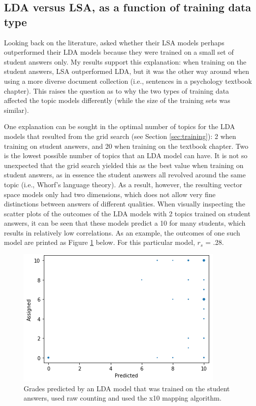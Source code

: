 \documentclass[a4paper,10pt,twoside]{article}
\begin{document}
\subsection{LDA versus LSA, as a function of training data type}
Looking back on the literature,  asked whether their LSA models perhaps outperformed their LDA models because they were trained on a small set of student answers only. My results support this explanation: when training on the student answers, LSA outperformed LDA, but it was the other way around when using a more diverse document collection (i.e., sentences in a psychology textbook chapter). This raises the question as to why the two types of training data affected the topic models differently (while the size of the training sets was similar).

One explanation can be sought in the optimal number of topics for the LDA models that resulted from the grid search (see Section \ref{sec:training}): 2 when training on student answers, and 20 when training on the textbook chapter. Two is the lowest possible number of topics that an LDA model can have. It is not so unexpected that the grid search yielded this as the best value when training on student answers, as in essence the student answers all revolved around the same topic (i.e., Whorf's language theory). As a result, however, the resulting vector space models only had two dimensions, which does not allow very fine distinctions between answers of different qualities. When visually inspecting the scatter plots of the outcomes of the LDA models with 2 topics trained on student answers, it can be seen that these models predict a 10 for many students, which results in relatively low correlations. As an example, the outcomes of one such model are printed as Figure \ref{lda-predicts-tens} below. For this particular model, $\textit{r}_s$ = .28.

\begin{figure}[h]
	\centering
	\includegraphics[width=0.5\linewidth]{"LDA predicts tens"}
	\caption{Grades predicted by an LDA model that was trained on the student answers, used raw counting and used the x10 mapping algorithm.}
	\label{lda-predicts-tens}
\end{figure}
\end{document}
